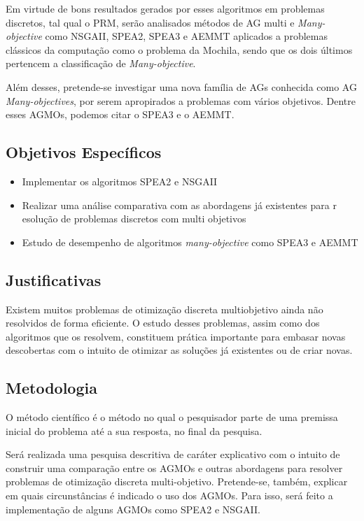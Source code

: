 \documentclass[]{article}
\begin{document}
	Em virtude de bons resultados gerados por esses algoritmos em problemas discretos, tal qual o PRM, serão analisados métodos de AG multi e \textit{Many-objective} como NSGAII\cite{NSGAII}, SPEA2\cite{SPEA2}, SPEA3 e AEMMT aplicados a problemas clássicos da computação como o problema da Mochila, sendo que os dois últimos pertencem a classificação de \textit{Many-objective}.
	
	Além desses, pretende-se investigar uma nova família de AGs conhecida como AG \textit{Many-objectives}, por serem apropirados a problemas com vários objetivos. Dentre esses AGMOs, podemos citar o SPEA3 e o AEMMT.
	
\subsection{Objetivos Específicos}

	\begin{itemize}
		\item Implementar os algoritmos SPEA2\cite{SPEA2} e NSGAII\cite{NSGAII}
		\item Realizar uma análise comparativa com as abordagens já existentes para r esolução de problemas discretos com multi objetivos
		\item Estudo de desempenho de algoritmos \textit{many-objective} como SPEA3 e AEMMT
	\end{itemize}

\subsection{Justificativas}
	
	Existem muitos problemas de otimização discreta multiobjetivo ainda não resolvidos de forma eficiente. O estudo desses problemas, assim como dos algoritmos que os resolvem, constituem prática importante para embasar novas descobertas com o intuito de otimizar as soluções já existentes ou de criar novas.

\subsection{Metodologia}
	
	O método científico é o método no qual o pesquisador parte de uma premissa inicial do problema até a sua resposta, no final da pesquisa.
	
	Será realizada uma pesquisa descritiva de caráter explicativo com o intuito de construir uma comparação entre os AGMOs e outras abordagens para resolver problemas de otimização discreta multi-objetivo. Pretende-se, também, explicar em quais circunstâncias é indicado o uso dos AGMOs. Para isso, será feito a implementação de alguns AGMOs como SPEA2\cite{SPEA2} e NSGAII\cite{NSGAII}.
	
\end{document}
